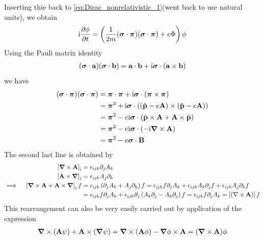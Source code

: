 Inserting thie back to \cref{eq:Dirac_nonrelativistic_1}(went back to use natural units), we obtain 
\begin{align}
    \mathrm{i} \frac{\partial \phi}{\partial t} = \left( \frac{1}{2m} (\boldsymbol{\sigma} \cdot \boldsymbol{\pi}) (\boldsymbol{\sigma} \cdot \boldsymbol{\pi}) + e \Phi \right) \phi
\end{align}
Using the Pauli matrix identity
\begin{align*}
    (\boldsymbol{\sigma} \cdot \mathbf{a}) (\boldsymbol{\sigma} \cdot \mathbf{b}) = \mathbf{a} \cdot \mathbf{b} + \mathrm{i} \boldsymbol{\sigma} \cdot (\mathbf{a} \times \mathbf{b}) 
\end{align*}
we have 
\begin{align*}
    (\boldsymbol{\sigma} \cdot \boldsymbol{\pi}) (\boldsymbol{\sigma} \cdot \boldsymbol{\pi}) & = \boldsymbol{\pi} \cdot \boldsymbol{\pi} + \mathrm{i} \boldsymbol{\sigma} \cdot (\boldsymbol{\pi} \times \boldsymbol{\pi}) \\
    & = \boldsymbol{\pi}^2 + \mathrm{i} \boldsymbol{\sigma} \cdot \left( (\hat{\mathbf{p}} - e \mathbf{A}) \times (\hat{\mathbf{p}} - e \mathbf{A}) \right) \\
    & = \boldsymbol{\pi}^2 - e \mathrm{i} \boldsymbol{\sigma} \cdot \left( \hat{\mathbf{p}} \times \mathbf{A} + \mathbf{A} \times \hat{\mathbf{p}} \right) \\
    & = \boldsymbol{\pi}^2 - e \mathrm{i} \boldsymbol{\sigma} \cdot \left( - \mathrm{i} \boldsymbol{\nabla} \times \mathbf{A} \right) \\
    & = \boldsymbol{\pi}^2 - e \boldsymbol{\sigma} \cdot \mathbf{B}
\end{align*}
The second last line is obtained by 
\begin{align*}
    \left[ \boldsymbol{\nabla} \times \mathbf{A} \right]_i & = \epsilon_{ijk} \partial_j A_k \\
    \left[\mathbf{A} \times \boldsymbol{\nabla} \right]_i & = \epsilon_{ijk} A_j \partial_k \\
    \implies \quad \left[\boldsymbol{\nabla} \times \mathbf{A} + \mathbf{A} \times \boldsymbol{\nabla} \right]_i f & = \epsilon_{ijk} \left( \partial_j A_k + A_j \partial_k \right) f = \epsilon_{ijk} f \partial_j A_k + \epsilon_{ijk} A_k \partial_j f + \epsilon_{ijk} A_j \partial_k f\\
    & = \epsilon_{ijk} f \partial_j A_k + \epsilon_{ijk} \partial_j \left( A_k \partial_j - A_k \partial_j \right)f = \epsilon_{ijk} f \partial_j A_k = \left[ (\nabla \times \mathbf{A}) \right]f
\end{align*}
This rearrangement can also be very easily carried out by application of the expression 
\begin{align*}
    \boldsymbol{\nabla} \times (\mathbf{A} \psi) + \mathbf{A} \times (\boldsymbol{\nabla} \psi) = \boldsymbol{\nabla} \times (\mathbf{A} \phi) - \boldsymbol{\nabla} \phi \times \mathbf{A} = (\boldsymbol{\nabla} \times \mathbf{A}) \phi
\end{align*}
